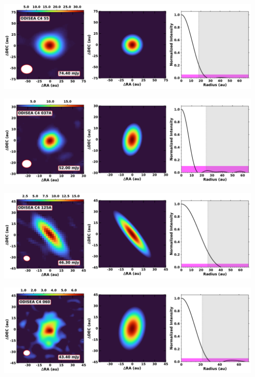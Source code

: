 \vspace{0pt}
\begin{minipage}{.49\textwidth}
	 \centering
	 	 \hrulesep
	 	 \includegraphics[width=1\linewidth]{pdf/0+II/056_odisea_c4_55_cutout.pdf}
\end{minipage}%
\vrulesep
\begin{minipage}{.49\textwidth}
	 \centering
	 	 \hrulesep
	 	 \includegraphics[width=1\linewidth]{pdf/0+II/052_odisea_c4_037a_cutout.pdf}
\end{minipage}%
\vspace{0pt}
\begin{minipage}{.49\textwidth}
	 \centering
	 	 \hrulesep
	 	 \includegraphics[width=1\linewidth]{pdf/0+II/051_odisea_c4_125a_cutout.pdf}
\end{minipage}%
\vrulesep
\begin{minipage}{.49\textwidth}
	 \centering
	 	 \hrulesep
	 	 \includegraphics[width=1\linewidth]{pdf/0+II/050_odisea_c4_060_cutout.pdf}
\end{minipage}%
